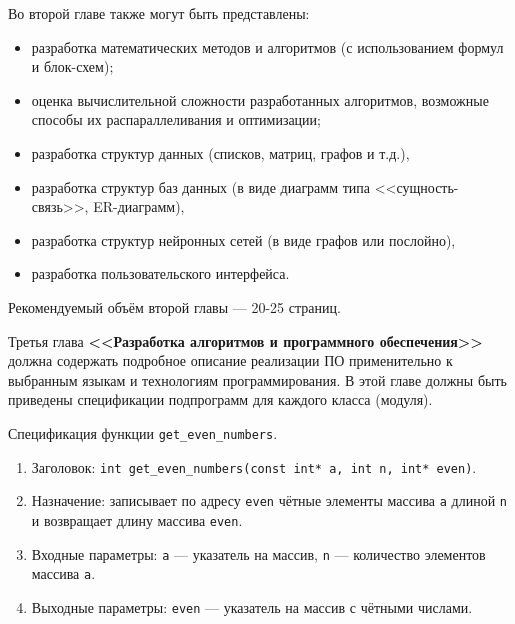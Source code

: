 \documentclass[14pt]{extarticle}
\begin{document}
Во второй главе также могут быть представлены:
\begin{itemize}[label=$\bullet$]
\item разработка математических методов и алгоритмов (с использованием формул и блок-схем);
\item оценка вычислительной сложности разработанных алгоритмов,  возможные способы их распараллеливания и оптимизации;
\item разработка структур данных (списков, матриц, графов и т.д.),
\item разработка структур баз данных (в виде диаграмм типа <<сущность-связь>>, ER-диаграмм),
\item разработка структур нейронных сетей (в виде графов или послойно),
\item разработка пользовательского интерфейса.
\end{itemize}

Рекомендуемый объём второй главы --- 20-25 страниц.

Третья глава {\bf <<Разработка алгоритмов и программного обеспечения>>} должна содержать подробное описание реализации ПО применительно к выбранным языкам и технологиям программирования. В этой главе должны быть приведены спецификации подпрограмм для каждого класса (модуля). 
\begin{tcolorbox}[title={Пример спецификации подпрограммы}]
	\par Спецификация функции \texttt{get\_even\_numbers}.
	\begin{enumerate}[label=\arabic*., wide]
	\item Заголовок: \texttt{int get\_even\_numbers(const int* a, int n, int* even)}.
	\item Назначение: записывает по адресу \texttt{even} чётные элементы массива \texttt{a} длиной \texttt{n} и возвращает длину массива \texttt{even}.
	\item Входные параметры: \texttt{a} --- указатель  на массив, \texttt{n} --- количество элементов массива \texttt{a}.
	\item Выходные параметры: \texttt{even} --- указатель на массив с чётными числами.
	\end{enumerate}
\end{tcolorbox}
\end{document}
